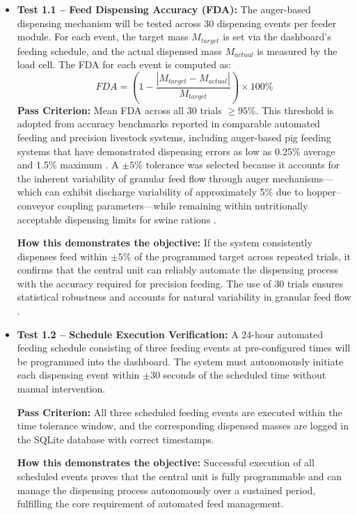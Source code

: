 \begin{itemize}
  \item \textbf{Test 1.1 -- Feed Dispensing Accuracy (FDA):} The auger-based dispensing mechanism will be tested across 30 dispensing events per feeder module. For each event, the target mass $M_{target}$ is set via the dashboard's feeding schedule, and the actual dispensed mass $M_{actual}$ is measured by the load cell. The FDA for each event is computed as:
    \begin{equation}
      FDA = \left(1 - \frac{|M_{target} - M_{actual}|}{M_{target}}\right) \times 100\%
    \end{equation}
    \textbf{Pass Criterion:} Mean FDA across all 30 trials $\geq 95\%$. This threshold is adopted from accuracy benchmarks reported in comparable automated feeding and precision livestock systems, including auger-based pig feeding systems that have demonstrated dispensing errors as low as 0.25\% average and 1.5\% maximum \cite{zhang2025precision,adeoye2025animalia,dingcong2017monitoring}. A $\pm 5\%$ tolerance was selected because it accounts for the inherent variability of granular feed flow through auger mechanisms---which can exhibit discharge variability of approximately 5\% due to hopper--conveyor coupling parameters---while remaining within nutritionally acceptable dispensing limits for swine rations \cite{chen2024screw,tangorra2018energy}.

    \textbf{How this demonstrates the objective:} If the system consistently dispenses feed within $\pm 5\%$ of the programmed target across repeated trials, it confirms that the central unit can reliably automate the dispensing process with the accuracy required for precision feeding. The use of 30 trials ensures statistical robustness and accounts for natural variability in granular feed flow \cite{adeoye2025animalia,dingcong2017monitoring}.

  \item \textbf{Test 1.2 -- Schedule Execution Verification:} A 24-hour automated feeding schedule consisting of three feeding events at pre-configured times will be programmed into the dashboard. The system must autonomously initiate each dispensing event within $\pm 30$ seconds of the scheduled time without manual intervention.

    \textbf{Pass Criterion:} All three scheduled feeding events are executed within the time tolerance window, and the corresponding dispensed masses are logged in the SQLite database with correct timestamps.

    \textbf{How this demonstrates the objective:} Successful execution of all scheduled events proves that the central unit is fully programmable and can manage the dispensing process autonomously over a sustained period, fulfilling the core requirement of automated feed management.
\end{itemize}


